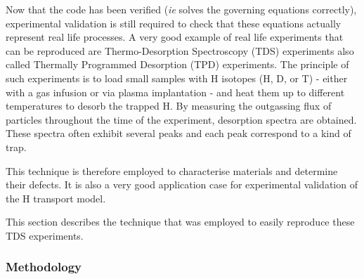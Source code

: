 Now that the code has been verified (\textit{ie} solves the governing equations correctly), experimental validation is still required to check that these equations actually represent real life processes.
A very good example of real life experiments that can be reproduced are Thermo-Desorption Spectroscopy (TDS) experiments also called Thermally Programmed Desorption (TPD) experiments.
The principle of such experiments is to load small samples with H isotopes (H, D, or T) - either with a gas infusion or via plasma implantation - and heat them up to different temperatures to desorb the trapped H.
By measuring the outgassing flux of particles throughout the time of the experiment, desorption spectra are obtained.
These spectra often exhibit several peaks and each peak correspond to a kind of trap.

This technique is therefore employed to characterise materials and determine their defects. 
It is also a very good application case for experimental validation of the H transport model.

This section describes the technique that was employed to easily reproduce these TDS experiments.

\subsubsection{Methodology} \label{methodology}


